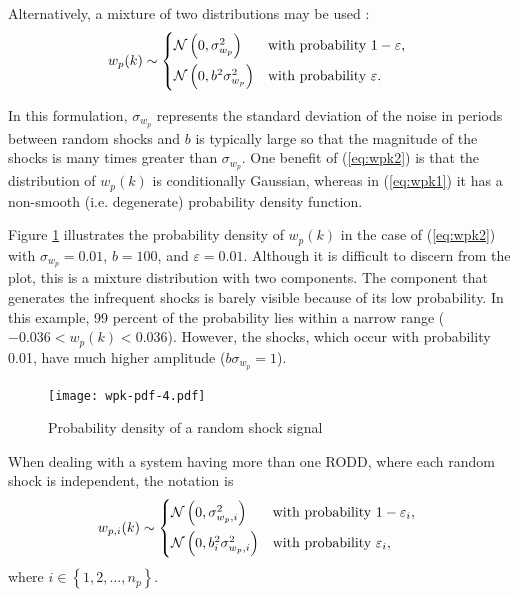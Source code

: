 Alternatively, a mixture of two distributions may be used \citep{robertson_detection_1995}:
\begin{equation} \label{eq:wpk2}
w_p(k) \sim 
	\begin{cases*}
		\mathcal{N}\left(0, \sigma_{w_p}^2\right) & with probability $1-\varepsilon$, \\
		\mathcal{N}\left(0, b^2\sigma_{w_p}^2\right) & with probability $\varepsilon$.
	\end{cases*}
\end{equation}
%
%

In this formulation, $\sigma_{w_p}$ represents the standard deviation of the noise in periods between random shocks and $b$ is typically large so that the magnitude of the shocks is many times greater than $\sigma_{w_p}$. One benefit of (\ref{eq:wpk2}) is that the distribution of $w_p(k)$ is conditionally Gaussian, whereas in (\ref{eq:wpk1}) it has a non-smooth (i.e. degenerate) probability density function.

Figure \ref{fig:wpk-pdf} illustrates the probability density of $w_p(k)$ in the case of (\ref{eq:wpk2}) with $\sigma_{w_p}=0.01$, $b=100$, and $\varepsilon=0.01$. Although it is difficult to discern from the plot, this is a mixture distribution with two components. The component that generates the infrequent shocks is barely visible because of its low probability. In this example, 99 percent of the probability lies within a narrow range ($-0.036 < w_p(k) < 0.036$). However, the shocks, which occur with probability 0.01, have much higher amplitude ($b\sigma_{w_p}=1$).

\begin{figure}[ht]
	\centering
	\texttt{[image: wpk-pdf-4.pdf]}
	\caption{Probability density of a random shock signal}
	\label{fig:wpk-pdf}
\end{figure}

When dealing with a system having more than one \gls{RODD}, where each random shock is independent, the notation is
\begin{equation} \label{eq:wpik2}
	w_{p,i}(k) \sim 
	\begin{cases*}
		\mathcal{N}\left(0, \sigma_{w_p,i}^2\right) & with probability $1-\varepsilon_i$, \\
		\mathcal{N}\left(0, b_i^2\sigma_{w_p,i}^2\right) & with probability $\varepsilon_i$,
	\end{cases*}
\end{equation}
where $i \in \left\{1, 2, ..., n_p\right\}$.
%

